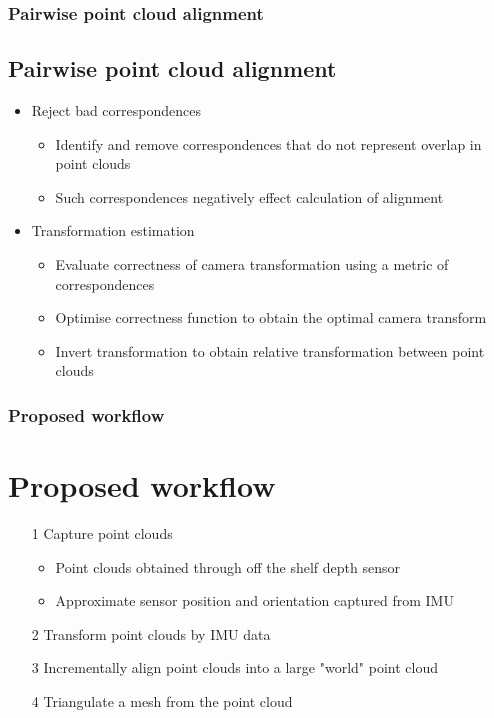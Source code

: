 \documentclass[10pt,serif,t]{beamer}
\newenvironment{Slide}[1]
{
  \begin{frame}[fragile,environment=Slide]
    \frametitle{#1}
    \section{#1}
  }
  {
  \end{frame}
}
\newenvironment{SubSlide}[1]
{
  \begin{frame}[fragile,environment=SubSlide]
    \frametitle{#1}
    \subsection{#1}
  }
  {
  \end{frame}
}
\begin{document}
\begin{SubSlide}{Pairwise point cloud alignment}
  \begin{itemize}
    \item
      Reject bad correspondences

      \begin{itemize}
        \item
          Identify and remove correspondences that do not represent overlap in
          point clouds

        \item
          Such correspondences negatively effect calculation of alignment

      \end{itemize}

      \pause

    \item
      Transformation estimation

      \begin{itemize}
        \item
          Evaluate correctness of camera transformation using a metric of
          correspondences

        \item
          Optimise correctness function to obtain the optimal camera transform

        \item
          Invert transformation to obtain relative transformation between point
          clouds

      \end{itemize}

  \end{itemize}
\end{SubSlide}

\begin{Slide}{Proposed workflow}
  \begin{enumerate}
    \item[1]
      Capture point clouds

      \begin{itemize}
        \item
          Point clouds obtained through off the shelf depth sensor

        \item
          Approximate sensor position and orientation captured from IMU

      \end{itemize}

    \item[2]
      Transform point clouds by IMU data

    \item[3]
      Incrementally align point clouds into a large "world" point cloud

    \item[4]
      Triangulate a mesh from the point cloud

  \end{enumerate}
\end{Slide}
\end{document}
